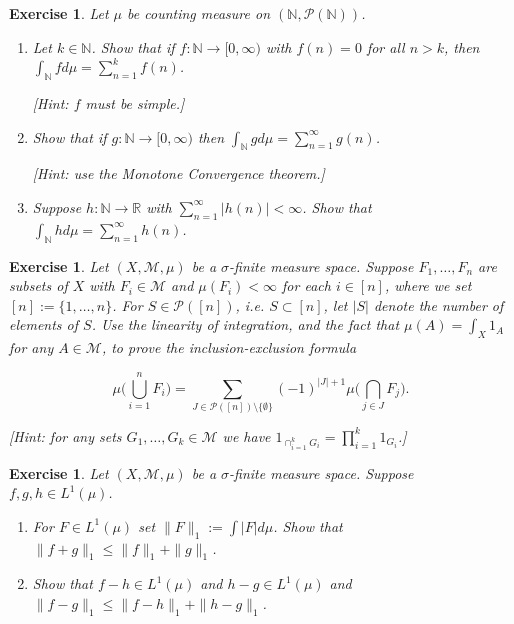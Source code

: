 \documentclass{article}
\newtheorem{exercise}[theorem]{Exercise}
\begin{document}
\begin{exercise}
Let \( \mu \) be counting measure on \( (\mathbb{N}, \mathcal{P}(\mathbb{N})) \).
\begin{enumerate}   
\item[(a)] Let \( k \in \mathbb{N} \). Show that if \( f : \mathbb{N} \to [0, \infty) \) with \( f(n) = 0 \) for all \( n > k \), then \( \int_{\mathbb{N}} f d\mu = \sum_{n=1}^{k} f(n) \).
    
    [\textit{Hint: \( f \) must be simple.}]
    
\item[(b)] Show that if \( g : \mathbb{N} \to [0, \infty) \) then \( \int_{\mathbb{N}} g d\mu = \sum_{n=1}^{\infty} g(n) \).
    
    [\textit{Hint: use the Monotone Convergence theorem.}]
    
\item[(c)] Suppose \( h : \mathbb{N} \to \mathbb{R} \) with \( \sum_{n=1}^{\infty} |h(n)| < \infty \). Show that \( \int_{\mathbb{N}} h d\mu = \sum_{n=1}^{\infty} h(n) \).
\end{enumerate}
\end{exercise} 
\begin{exercise}
Let \( (X, \mathcal{M}, \mu) \) be a \(\sigma\)-finite measure space. Suppose \( F_1, \dots, F_n \) are subsets of \( X \) with \( F_i \in \mathcal{M} \) and \( \mu(F_i) < \infty \) for each \( i \in [n] \), where we set \( [n] := \{1, \dots, n\} \). For \( S \in \mathcal{P}([n]) \), i.e. \( S \subset [n] \), let \( |S| \) denote the number of elements of \( S \). Use the linearity of integration, and the fact that \( \mu(A) = \int_X 1_A \) for any \( A \in \mathcal{M} \), to prove the \textit{inclusion-exclusion formula}
    
    \[
    \mu\Big(\bigcup_{i=1}^{n} F_i\Big) = \sum_{J \in \mathcal{P}([n]) \setminus \{\emptyset\}} (-1)^{|J|+1} \mu\Big(\bigcap_{j \in J} F_j\Big).
    \]
    
    [\textit{Hint: for any sets \( G_1, \dots, G_k \in \mathcal{M} \) we have \( 1_{\cap_{i=1}^{k} G_i} = \prod_{i=1}^{k} 1_{G_i} \).}]
\end{exercise}  
\begin{exercise}
Let \( (X, \mathcal{M}, \mu) \) be a \(\sigma\)-finite measure space. Suppose \( f,g,h \in L^1(\mu) \).
\begin{enumerate}   
\item[(a)] For \( F \in L^1(\mu) \) set \( \|F\|_1 := \int |F| d\mu \). Show that \( \|f + g\|_1 \leq \|f\|_1 + \|g\|_1 \).
    
\item[(b)] Show that \( f - h \in L^1(\mu) \) and \( h - g \in L^1(\mu) \) and \( \|f - g\|_1 \leq \|f - h\|_1 + \|h - g\|_1 \).
\end{enumerate}
\end{exercise}
\end{document}
